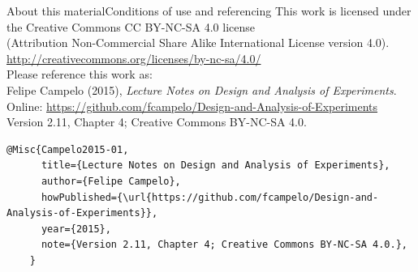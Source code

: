 \documentclass[t]{beamer}
\begin{document}
\begin{ftstf}{About this material}{Conditions of use and referencing}
\centering\footnotesize This work is licensed under the Creative Commons CC BY-NC-SA 4.0 license\\(Attribution Non-Commercial Share Alike International License version 4.0).\\
\vhalf
\url{http://creativecommons.org/licenses/by-nc-sa/4.0/}\\
\vone
\footnotesize Please reference this work as:\\
\footnotesize \flushleft Felipe Campelo (2015), \textit{Lecture Notes on Design and Analysis of Experiments}.\\Online: {\scriptsize\url{https://github.com/fcampelo/Design-and-Analysis-of-Experiments}}\\
Version 2.11, Chapter 4; Creative Commons BY-NC-SA 4.0.\\

\begin{Verbatim}[fontsize=\tiny]
    @Misc{Campelo2015-01,
      title={Lecture Notes on Design and Analysis of Experiments},
      author={Felipe Campelo},
      howPublished={\url{https://github.com/fcampelo/Design-and-Analysis-of-Experiments}},
      year={2015},
      note={Version 2.11, Chapter 4; Creative Commons BY-NC-SA 4.0.},
    }
\end{Verbatim}

\end{ftstf}
\end{document}
